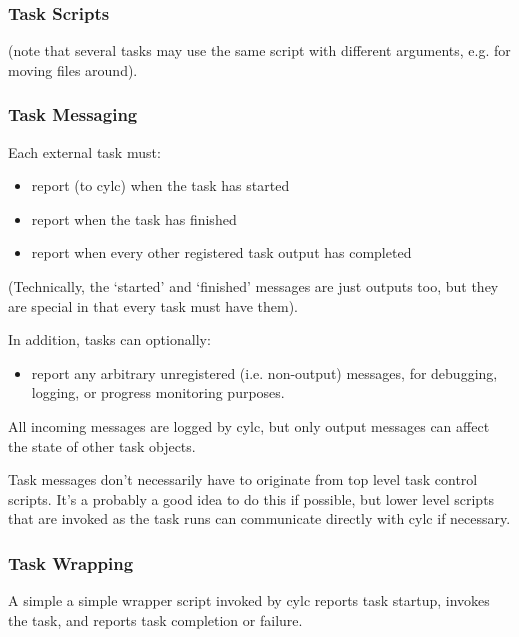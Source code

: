 \documentclass[11pt,a4paper]{article}
\begin{document}
\lstset{language=cylctaskdef}

{

}

\pagebreak
\subsubsection{Task Scripts}

(note that several tasks may use the same script with different
arguments, e.g. for moving files around).

\subsubsection{Task Messaging}

Each external task must:

\begin{itemize}
\item report (to cylc) when the task has started
\item report when the task has finished
\item report when every other registered task output has
completed
\end{itemize}

(Technically, the `started' and `finished' messages are just
outputs too, but they are special in that every task
must have them).

In addition, tasks can optionally:

\begin{itemize}
\item report any arbitrary unregistered (i.e. non-output)
messages, for debugging, logging, or progress monitoring purposes.
\end{itemize}

All incoming messages are logged by cylc, but only output messages can
affect the state of other task objects.

Task messages don't necessarily have to originate from top level task
control scripts. It's a probably a good idea to do this if possible, but
lower level scripts that are invoked as the task runs can communicate
directly with cylc if necessary.

\subsubsection{Task Wrapping}

A simple a simple wrapper script invoked by cylc reports task
startup, invokes the task, and reports task completion or failure. 
\end{document}
